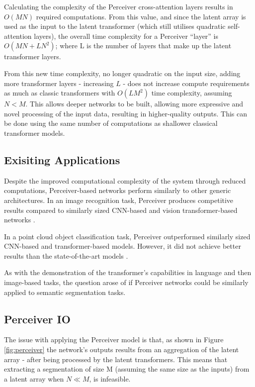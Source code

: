 \documentclass{l4proj}
\begin{document}
Calculating the complexity of the Perceiver cross-attention layers results in $O(MN)$ required computations. From this value, and since the latent array is used as the input to the latent transformer (which still utilises quadratic self-attention layers), the overall time complexity for a Perceiver “layer” is $O(MN + LN^2)$; where L is the number of layers that make up the latent transformer layers.

From this new time complexity, no longer quadratic on the input size, adding more transformer layers - increasing $L$ - does not increase compute requirements as much as classic transformers with $O(LM^2)$ time complexity, assuming $N < M$. This allows deeper networks to be built, allowing more expressive and novel processing of the input data, resulting in higher-quality outputs. This can be done using the same number of computations as shallower classical transformer models.

	\subsection{Exisiting Applications}

Despite the improved computational complexity of the system through reduced computations, Perceiver-based networks perform similarly to other generic architectures. In an image recognition task, Perceiver produces competitive results compared to similarly sized CNN-based and vision transformer-based networks \citep{perceiver}.

In a point cloud object classification task, Perceiver outperformed similarly sized CNN-based and transformer-based models. However, it did not achieve better results than the state-of-the-art models \citep{perceiver}.

As with the demonstration of the transformer’s capabilities in language and then image-based tasks, the question arose of if Perceiver networks could be similarly applied to semantic segmentation tasks.

	\subsection{Perceiver IO} \label{sec:perceiverio}

The issue with applying the Perceiver model is that, as shown in Figure \ref{fig:perceiver} the network's outputs results from an aggregation of the latent array - after being processed by the latent transformers. This means that extracting a segmentation of size M (assuming the same size as the inputs) from a latent array when $N \ll M$, is infeasible.
\end{document}
